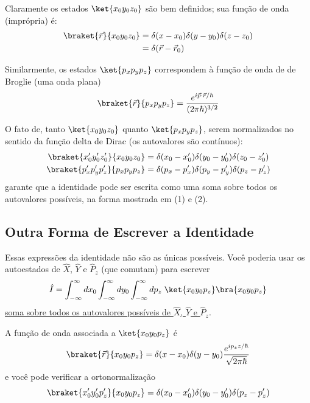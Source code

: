 Claramente os estados $\ket{x_0y_0z_0}$ são bem definidos; sua função de onda (imprópria) é:
\begin{align}
    \braket{\vec{r}}{x_0y_0z_0} &= \delta(x-x_0)\delta(y-y_0)\delta(z-z_0) \notag \\
    &= \delta(\vec{r}-\vec{r}_0)
\label{eq:aula22_funcao_onda_xyz}
\end{align}

Similarmente, os estados $\ket{p_xp_yp_z}$ correspondem à função de onda de de Broglie (uma onda plana)
\begin{equation}
    \braket{\vec{r}}{p_xp_yp_z} = \frac{e^{i\vec{p}\cdot\vec{r}/\hbar}}{(2\pi\hbar)^{3/2}}
\label{eq:aula22_funcao_onda_debroglie}
\end{equation}

O fato de, tanto $\ket{x_0y_0z_0}$ quanto $\ket{p_xp_yp_z}$, serem normalizados no sentido da função delta de Dirac (os autovalores são contínuos):
\begin{align}
    \braket{x_0'y_0'z_0'}{x_0y_0z_0} &= \delta(x_0-x_0')\delta(y_0-y_0')\delta(z_0-z_0') \label{eq:aula22_norm_xyz} \\
    \braket{p_x'p_y'p_z'}{p_xp_yp_z} &= \delta(p_x-p_x')\delta(p_y-p_y')\delta(p_z-p_z') \label{eq:aula22_norm_pxpypz}
\end{align}
garante que a identidade pode ser escrita como uma soma sobre todos os autovalores possíveis, na forma mostrada em (1) e (2).

\subsection*{Outra Forma de Escrever a Identidade}

Essas expressões da identidade não são as únicas possíveis. Você poderia usar os autoestados de $\hat{X}$, $\hat{Y}$ e $\hat{P}_z$ (que comutam) para escrever
\begin{equation}
    \hat{I} = \int_{-\infty}^{\infty}dx_0\int_{-\infty}^{\infty}dy_0\int_{-\infty}^{\infty}dp_z \; \ket{x_0y_0p_z}\bra{x_0y_0p_z}
\label{eq:aula22_identidade_xypz}
\end{equation}
\underline{soma sobre todos os autovalores possíveis de $\hat{X}$, $\hat{Y}$ e $\hat{P}_z$}.

A função de onda associada a $\ket{x_0y_0p_z}$ é
\begin{equation}
    \braket{\vec{r}}{x_0y_0p_z} = \delta(x-x_0)\delta(y-y_0)\frac{e^{ip_zz/\hbar}}{\sqrt{2\pi\hbar}}
\label{eq:aula22_funcao_onda_xypz}
\end{equation}
e você pode verificar a ortonormalização
\begin{equation}
    \braket{x_0'y_0'p_z'}{x_0y_0p_z} = \delta(x_0-x_0')\delta(y_0-y_0')\delta(p_z-p_z')
\label{eq:aula22_ortonormalizacao_xypz}
\end{equation}


